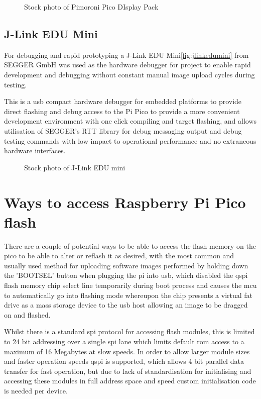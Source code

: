 \begin{figure}[ht]
	\centering
	\caption{Stock photo of Pimoroni Pico DIsplay Pack\cite{PicoDisplayPack}}
	\label{fig:picodisplaypack}
\end{figure}
	
\clearpage
\subsection{J-Link EDU Mini}
For debugging and rapid prototyping a J-Link EDU Mini\cite{JLinkEDUMini}\autoref{fig:jlinkedumini} from SEGGER GmbH was used as the hardware debugger for project to enable rapid development and debugging without constant manual image upload cycles during testing.

This is a \gls{usb} compact hardware debugger for embedded platforms to provide direct flashing and debug access to the Pi Pico to provide a more convenient development environment with one click compiling and target flashing, and allows utilisation of SEGGER's RTT library for debug messaging output and debug testing commands with low impact to operational performance and no extraneous hardware interfaces.

\begin{figure}[ht]
	\centering
	\caption{Stock photo of J-Link EDU mini\cite{JLinkEDUMini}}
	\label{fig:jlinkedumini}
\end{figure}

\clearpage
\section{Ways to access Raspberry Pi Pico flash}

There are a couple of potential ways to be able to access the flash memory on the pico to be able to alter or reflash it as desired, with the most common and usually used method for uploading software images performed by holding down the 'BOOTSEL' button when plugging the pi into \gls{usb}, which disabled the \gls{qspi} flash memory chip select line temporarily during boot process and causes the \gls{mcu} to automatically go into flashing mode whereupon the chip presents a virtual fat drive as a mass storage device to the \gls{usb} host allowing an image to be dragged on and flashed.

Whilst there is a standard \gls{spi} protocol for accessing flash modules, this is limited to 24 bit addressing over a single \gls{spi} lane which limits default \gls{rom} access to a maximum of 16 Megabytes at slow speeds. In order to allow larger module sizes and faster operation speeds \gls{qspi} is supported, which allows 4 bit parallel data transfer for fast operation, but due to lack of standardisation for initialising and accessing these modules in full address space and speed custom initialisation code is needed per device.

